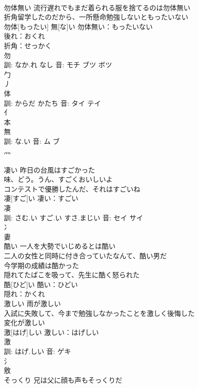 \documentclass[8pt]{extreport}
\begin{document}
\begin{CJK}{UTF8}{min}
\\	勿体無い	流行遅れでもまだ着られる服を捨てるのは勿体無い 
\\	折角留学したのだから、一所懸命勉強しないともったいない 
\\	勿体[もったい] 無[な]い			勿体無い：もったいない
\\	後れ：おくれ
\\	折角：せっかく
\\	勿 
\\	訓: なか.れ なし 音: モチ ブツ ボツ 
\\	勹 
\\	丿 
\\	体 
\\	訓: からだ かたち 音: タイ テイ 
\\	亻 
\\	本 
\\	無 
\\	訓: な.い 音: ム ブ 
\\	灬 
\\	[無明]	
\\	凄い	昨日の台風はすごかった 
\\	味、どう。うん、すごくおいしいよ 
\\	コンテストで優勝したんだ、それはすごいね 
\\	凄[すご]い			凄い：すごい
\\	凄 
\\	訓: さむ.い すご.い すさ.まじい 音: セイ サイ 
\\	冫 
\\	妻 
\\	酷い	一人を大勢でいじめるとは酷い 
\\	二人の女性と同時に付き合っていたなんて、酷い男だ 
\\	今学期の成績は酷かった 
\\	隠れてたばこを吸って、先生に酷く怒られた 
\\	酷[ひど]い			酷い：ひどい
\\	隠れ：かくれ
\\	激しい	雨が激しい 
\\	入試に失敗して、今まで勉強しなかったことを激しく後悔した 
\\	変化が激しい 
\\	激[はげ]しい			激しい：はげしい
\\	激 
\\	訓: はげ.しい 音: ゲキ 
\\	氵 
\\	敫	
\\	そっくり	兄は父に顔も声もそっくりだ 

\end{CJK}
\end{document}
